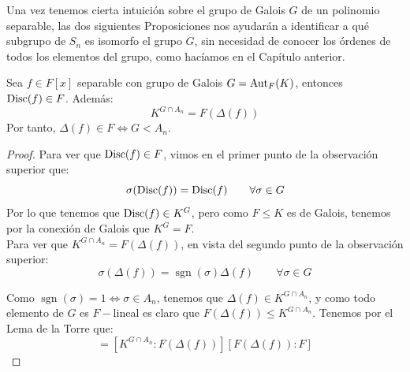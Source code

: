 Una vez tenemos cierta intuición sobre el grupo de Galois $G$ de un polinomio separable, las dos siguientes Proposiciones nos ayudarán a identificar a qué subgrupo de $S_n$ es isomorfo el grupo $G$, sin necesidad de conocer los órdenes de todos los elementos del grupo, como hacíamos en el Capítulo anterior.



\begin{prop}\label{prop:discf}
    Sea $f\in F[x]$ separable con grupo de Galois $G = \operatorname{Aut}_F(K)$, entonces $\operatorname{Disc}(f) \in F$. Además:
    \begin{equation*}
        K^{G\cap A_n} = F(\Delta(f))
    \end{equation*}
    Por tanto, $\Delta(f) \in F \Longleftrightarrow G< A_n$.
    \begin{proof}
        Para ver que $\operatorname{Disc}(f)\in F$, vimos en el primer punto de la observación superior que:
        \begin{equation*}
            \sigma(\operatorname{Disc}(f)) = \operatorname{Disc}(f) \qquad \forall \sigma\in G
        \end{equation*}
        Por lo que tenemos que $\operatorname{Disc}(f) \in K^G$, pero como $F\leq K$ es de Galois, tenemos por la conexión de Galois que $K^G = F$.\\


        Para ver que $K^{G\cap A_n} = F(\Delta(f))$, en vista del segundo punto de la observación superior:
        \begin{equation*}
            \sigma(\Delta(f)) = \operatorname{sgn}(\sigma)\Delta(f) \qquad \forall \sigma\in G
        \end{equation*}

        Como $\operatorname{sgn}(\sigma) = 1 \Longleftrightarrow \sigma\in A_n$, tenemos que $\Delta(f)\in K^{G\cap A_n}$, y como todo elemento de $G$ es $F-$lineal es claro que $F(\Delta(f)) \leq K^{G\cap A_n}$. Tenemos por el Lema de la Torre que:
        \begin{equation*}
            [K^{G\cap A_n} : F] = [K^{G\cap A_n} : F(\Delta(f))][F(\Delta(f)) : F]
        \end{equation*}       
        

\end{proof}
\end{prop}
